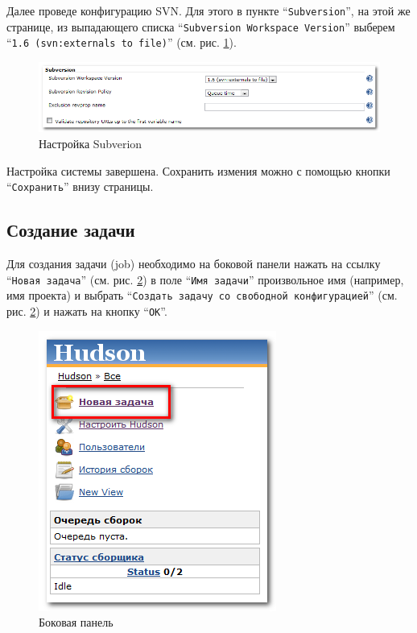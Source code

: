 \documentclass[a4paper,12pt]{article}
\begin{document}
Далее проведе конфигурацию SVN. Для этого в пункте ``\texttt{Subversion}'', на этой же странице, из выпадающего списка
``\texttt{Subversion Workspace Version}'' выберем ``\texttt{1.6 (svn:externals to file)}'' (см. рис.
\ref{pic.hudson.configuration.system-options.svn-conf}).

\begin{figure}[htp]
	\begin{center}
	  \includegraphics[scale = 0.6]{conf-svn.png}
	  \caption{Настройка Subverion}
	  \label{pic.hudson.configuration.system-options.svn-conf}
	\end{center}
\end{figure}

Настройка системы завершена. Сохранить измения можно с помощью кнопки ``\texttt{Сохранить}'' внизу страницы.

\subsection{Создание задачи} 
\label{sec.job-createion}
Для создания задачи (job) необходимо на боковой панели нажать на ссылку ``\texttt{Новая задача}'' (см. рис.
\ref{pic.hudson.sidebar.new-job}) в поле ``\texttt{Имя задачи}'' произвольное имя (например, имя проекта) и выбрать
``\texttt{Создать задачу со свободной конфигурацией}'' (см. рис. \ref{pic.hudson.sidebar.new-job}) и нажать на кнопку
``\texttt{OK}''.

\begin{figure}[htp]
\begin{center}
  \includegraphics[scale = 0.6]{new-job-1.png}
  \caption{Боковая панель}
  \label{pic.hudson.sidebar.new-job}
\end{center}
\end{figure}
\end{document}
